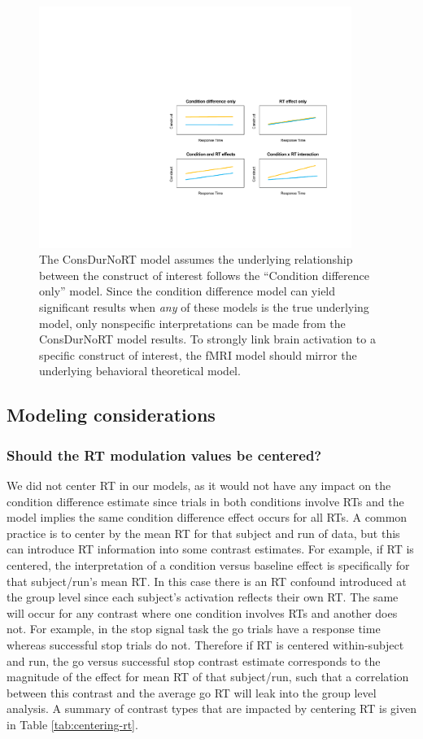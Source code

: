 \documentclass[titlepage,12pt] {article}
\begin{document}
\begin{figure}
  \centering
   \includegraphics[width=4in]{Figures/underlying_theory_models.pdf}
   \caption{The ConsDurNoRT model assumes the underlying relationship between the construct of interest follows the ``Condition difference only'' model.  Since the condition difference model can yield significant results when \emph{any} of these models is the true underlying model, only nonspecific interpretations can be made from the ConsDurNoRT model results.  To strongly link brain activation to a specific construct of interest, the fMRI model should mirror the underlying behavioral theoretical model.}
  \label{fig:underlying-theory}
\end{figure}

\subsection*{Modeling considerations}

\subsubsection*{Should the RT modulation values be centered?}
We did not center RT in our models, as it would not have any impact on the condition difference estimate since trials in both conditions involve RTs and the model implies the same condition difference effect occurs for all RTs.  A common practice is to center by the mean RT for that subject and run of data, but this can introduce RT information into some contrast estimates.  For example, if RT is centered, the interpretation of a condition versus baseline effect is specifically for that subject/run's mean RT.  In this case there is an RT confound introduced at the group level since each subject's activation reflects their own RT.  The same will occur for any contrast where one condition involves RTs and another does not.  For example, in the stop signal task the go trials have a response time whereas successful stop trials do not.  Therefore if RT is centered within-subject and run, the go versus successful stop contrast estimate corresponds to the magnitude of the effect for mean RT of that subject/run, such that a correlation between this contrast and the average go RT will leak into the group level analysis.  A summary of contrast types that are impacted by centering RT is given in Table \ref{tab:centering-rt}.
\end{document}
